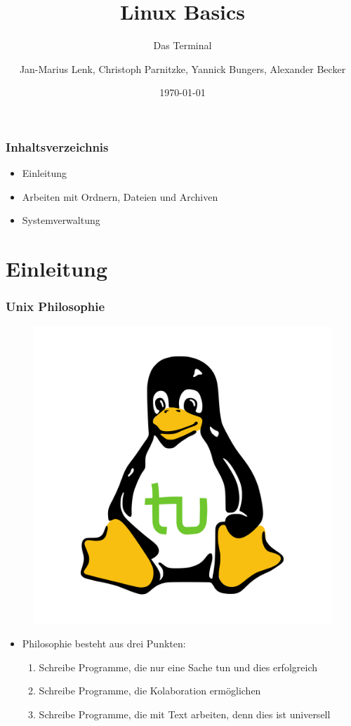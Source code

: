 \documentclass[12pt,utf8]{beamer}
\title{Linux Basics}
\subtitle{Das Terminal}
\author[J.-M. Lenk, C. Parnitzke, Y. Bungers, A. Becker]{Jan-Marius Lenk, Christoph Parnitzke, Yannick Bungers, Alexander Becker}
\institute[FOSS AG]{Free and Open Source Software AG\\ Fakultät für Informatik}
\date{\today}
\begin{document}
\titlepage

\begin{frame}
\frametitle{Inhaltsverzeichnis}
\begin{itemize}
	\item Einleitung
	\item Arbeiten mit Ordnern, Dateien und Archiven
	\item Systemverwaltung
\end{itemize}
\end{frame}

\section{Einleitung}
\begin{frame}
\frametitle{Unix Philosophie}
\begin{figure}
\includegraphics[scale=0.15]{res/tuX_tu.png}
\end{figure}
\begin{itemize}
	\item Philosophie besteht aus drei Punkten:
	\begin{enumerate}
		\item Schreibe Programme, die nur eine Sache tun und dies erfolgreich
		\item Schreibe Programme, die Kolaboration ermöglichen
		\item Schreibe Programme, die mit Text arbeiten, denn dies ist universell
	\end{enumerate}
\end{itemize}
\end{frame}
\end{document}
